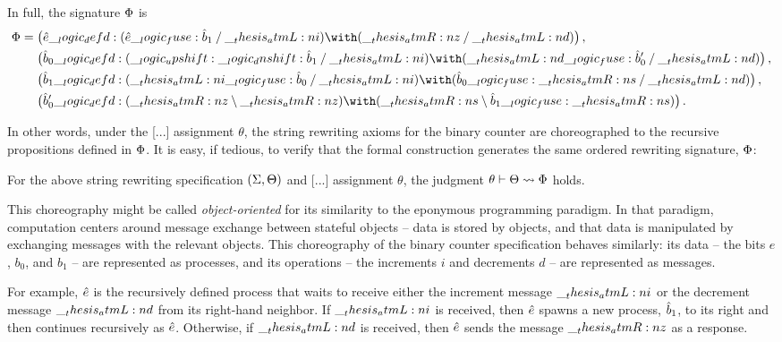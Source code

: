 %
In full, the signature $\Phi$ is
\begin{equation*}
  \orsig =
  \begin{lgathered}[t]
    \bigl(\defp{e} \defd (\defp{e} \fuse \defp{b}_1 \pmir \atmL{i}) \with (\atmR{z} \pmir \atmL{d})\bigr) \,, \\
    \bigl(\defp{b}_0 \defd (\up \dn \defp{b}_1 \pmir \atmL{i}) \with (\atmL{d} \fuse \defp{b}'_0 \pmir \atmL{d})\bigr) \,, \\
    \bigl(\defp{b}_1 \defd (\atmL{i} \fuse \defp{b}_0 \pmir \atmL{i}) \with (\defp{b}_0 \fuse \atmR{s} \pmir \atmL{d})\bigr) \,, \\
    \bigl(\defp{b}'_0 \defd (\atmR{z} \limp \atmR{z}) \with (\atmR{s} \limp \defp{b}_1 \fuse \atmR{s})\bigr)
  \,.
  \end{lgathered}
\end{equation*}



In other words, under the [...] assignment $\theta$, the string rewriting axioms for the binary counter are choreographed to the recursive propositions defined in $\Phi$.
It is easy, if tedious, to verify that 
the formal construction generates the same ordered rewriting signature, $\Phi$:
%
\begin{proposition}
  For the above string rewriting specification $(\Sigma, \Theta)$ and [...] assignment $\theta$, the judgment $\theta \vdash \Theta \rightsquigarrow \Phi$ holds.
\end{proposition}

This choreography might be called \emph{object-oriented} for its similarity to the eponymous programming paradigm.
In that paradigm, computation centers around message exchange between stateful objects -- data is stored by objects, and that data is manipulated by exchanging messages with the relevant objects.
This choreography of the binary counter specification behaves similarly:
its data -- the bits $e$, $b_0$, and $b_1$ -- are represented as processes, and its operations -- the increments $i$ and decrements $d$ -- are represented as messages.


For example, $\hat{e}$ is the recursively defined process that waits to receive either the increment message $\__thesis_atmL:n {i}$ or the decrement message $\__thesis_atmL:n {d}$ from its right-hand neighbor.
If $\__thesis_atmL:n {i}$ is received, then $\hat{e}$ spawns a new process, $\hat{b}_1$, to its right and then continues recursively as $\hat{e}$.
Otherwise, if $\__thesis_atmL:n {d}$ is received, then $\hat{e}$ sends the message $\__thesis_atmR:n {z}$ as a response.

